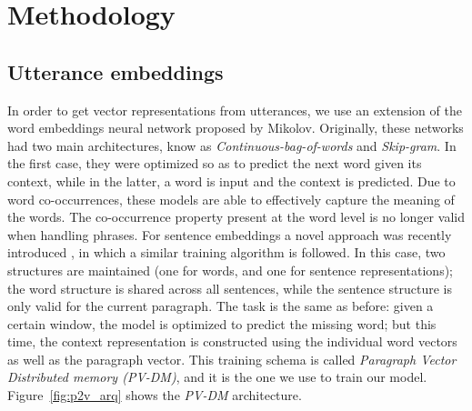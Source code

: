 \section{Methodology}\label{sec:method}
%

\subsection{Utterance embeddings} 

In order to get vector representations from utterances, we use an extension of the word embeddings neural network proposed by Mikolov\cite{mikolov2013efficient}. Originally, these networks had two main architectures, know as \emph{Continuous-bag-of-words} and \emph{Skip-gram}. In the first case, they were optimized so as to predict the next word given its context, while in the latter, a word is input and the context is predicted. Due to word co-occurrences, these models are able to effectively capture the meaning of the words. The co-occurrence property present at the word level is no longer valid when handling phrases. For sentence embeddings a novel approach was recently introduced , in which a similar training algorithm is followed. In this case, two structures are maintained (one for words, and one for sentence representations); the word structure is shared across all sentences, while the sentence structure is only valid for the current paragraph. The task is the same as before: given a certain window, the model is optimized to predict the missing word; but this time, the context representation is constructed using the individual word vectors as well as the paragraph vector. This training schema is called \emph{Paragraph Vector Distributed memory (PV-DM)}, and it is the one we use to train our model. Figure~\ref{fig:p2v_arq} shows the \emph{PV-DM} architecture.

